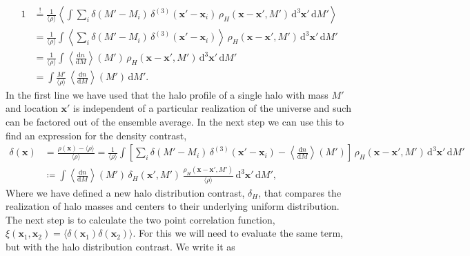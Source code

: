 \documentclass[oneside]{book}
\newcommand*{\rd}{\mathrm{d}}
\begin{document}
\begin{align}
    1 &\overset{!}{=} \frac{1}{\langle \rho \rangle} \left\langle \int \sum_i \delta(M'-M_i)\,\delta^{(3)}(\boldsymbol{x}'-\boldsymbol{x}_i)\,\rho_H(\boldsymbol{x}-\boldsymbol{x}',M')\, \rd^3 \boldsymbol{x}' \, \rd M' \right \rangle \\
    &= \frac{1}{\langle \rho \rangle} \int \left\langle \sum_i \delta(M'-M_i)\,\delta^{(3)}(\boldsymbol{x}'-\boldsymbol{x}_i) \right\rangle\,\rho_H(\boldsymbol{x}-\boldsymbol{x}',M')\, \rd^3 \boldsymbol{x}' \,\rd M' \nonumber\\
    &= \frac{1}{\langle \rho \rangle} \int \left\langle  \frac{\rd n}{\rd M} \right\rangle(M')\,\rho_H(\boldsymbol{x}-\boldsymbol{x}',M')\, \rd^3 \boldsymbol{x}' \,\rd M'  \nonumber\\
    &=  \int \frac{M'}{\langle \rho \rangle} \,\left\langle  \frac{\rd n}{\rd M} \right\rangle(M') \,\rd M' .\label{eq:halo_mass_function_normalization}
\end{align} 
In the first line we have used that the halo profile of a single halo with mass $M'$ and location $\boldsymbol{x}'$ is independent of a particular realization of the universe and such can be factored out of the ensemble average. In the next step we can use this to find an expression for the density contrast,
\begin{align}
    \label{eq:density-contrast}
    \delta(\boldsymbol{x}) &= \frac{\rho(\boldsymbol{x})-\langle \rho \rangle }{\langle \rho \rangle} = \frac{1}{\langle \rho \rangle} \int \left[  \sum_i \delta(M'-M_i)\,\delta^{(3)}(\boldsymbol{x}'-\boldsymbol{x}_i)-\left\langle  \frac{\rd n}{\rd M} \right\rangle(M')\right]\,\rho_H(\boldsymbol{x}-\boldsymbol{x}',M')\, \rd^3 \boldsymbol{x}' \,\rd M'\\
&\coloneqq  \int \left\langle  \frac{\rd n}{\rd M} \right\rangle(M')\,\delta_H(\boldsymbol{x}',M') \,\frac{\rho_H(\boldsymbol{x}-\boldsymbol{x}',M')}{\langle \rho \rangle}\, \rd^3 \boldsymbol{x}' \,\rd M',
\end{align}
Where we have defined a new halo distribution contrast, $\delta_H$, that compares the realization of halo masses and centers to their underlying uniform distribution. The next step is to calculate the two point correlation function, $\xi(\boldsymbol{x}_1,\boldsymbol{x}_2) = \langle \delta(\boldsymbol{x}_1) \delta(\boldsymbol{x}_2) \rangle$. For this we will need to evaluate the same term, but with the halo distribution contrast. We write it as
\end{document}
